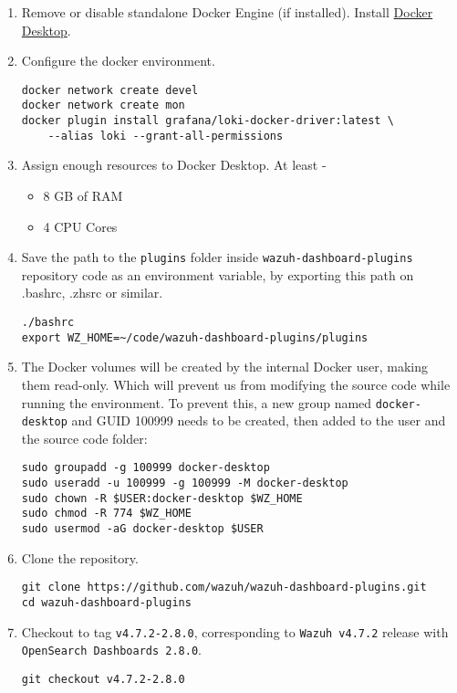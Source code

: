 \begin{enumerate}
    \item Remove or disable standalone Docker Engine (if installed). Install \href{https://docs.docker.com/get-docker/}{Docker Desktop}.
    \item Configure the docker environment.
    \begin{verbatim}
docker network create devel
docker network create mon
docker plugin install grafana/loki-docker-driver:latest \
    --alias loki --grant-all-permissions
    \end{verbatim}
    \item Assign enough resources to Docker Desktop. At least -
    \begin{itemize}
        \item 8 GB of RAM
        \item 4 CPU Cores
    \end{itemize}
    \item Save the path to the \texttt{plugins} folder inside \texttt{wazuh-dashboard-plugins} repository code as an environment variable, by exporting this path on .bashrc, .zhsrc or similar.
    \begin{verbatim}
./bashrc
export WZ_HOME=~/code/wazuh-dashboard-plugins/plugins
    \end{verbatim}
    \item The Docker volumes will be created by the internal Docker user, making them read-only. Which will prevent us from modifying the source code while running the environment. To prevent this, a new group named \texttt{docker-desktop} and GUID 100999 needs to be created, then added to the user and the source code folder:
    \begin{verbatim}
sudo groupadd -g 100999 docker-desktop
sudo useradd -u 100999 -g 100999 -M docker-desktop
sudo chown -R $USER:docker-desktop $WZ_HOME
sudo chmod -R 774 $WZ_HOME
sudo usermod -aG docker-desktop $USER
    \end{verbatim}
    \item Clone the repository.
    \begin{verbatim}
git clone https://github.com/wazuh/wazuh-dashboard-plugins.git
cd wazuh-dashboard-plugins
    \end{verbatim}
    \item Checkout to tag \texttt{v4.7.2-2.8.0}, corresponding to \texttt{Wazuh v4.7.2} release with \texttt{OpenSearch Dashboards 2.8.0}.
    \begin{verbatim}
git checkout v4.7.2-2.8.0
    \end{verbatim}


\end{enumerate}
